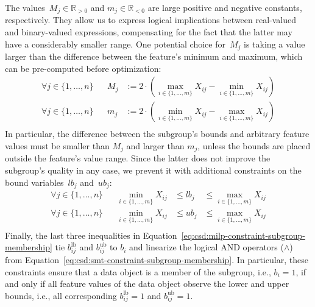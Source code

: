 \documentclass{article}
\theoremstyle{definition}
\begin{document}
The values~$M_j \in \mathbb{R}_{> 0}$ and $m_j \in \mathbb{R}_{< 0}$ are large positive and negative constants, respectively.
They allow us to express logical implications between real-valued and binary-valued expressions, compensating for the fact that the latter may have a considerably smaller range.
One potential choice for~$M_j$ is taking a value larger than the difference between the feature's minimum and maximum, which can be pre-computed before optimization:
%
\begin{equation}
	\begin{aligned}
		\forall j \in \{1, \dots, n\} & & M_j &:= 2 \cdot \left( \max_{i \in \{1, \dots, m\}} X_{ij} - \min_{i \in \{1, \dots, m\}} X_{ij} \right) \\
		\forall j \in \{1, \dots, n\} & & m_j &:= 2 \cdot \left( \min_{i \in \{1, \dots, m\}} X_{ij} - \max_{i \in \{1, \dots, m\}} X_{ij} \right) \\
	\end{aligned}
	\label{eq:csd:milp-big-m}
\end{equation}
%
In particular, the difference between the subgroup's bounds and arbitrary feature values must be smaller than $M_j$ and larger than $m_j$, unless the bounds are placed outside the feature's value range.
Since the latter does not improve the subgroup's quality in any case, we prevent it with additional constraints on the bound variables~$\mathit{lb}_j$ and~$\mathit{ub}_j$:
%
\begin{equation}
	\begin{aligned}
		\forall j \in \{1, \dots, n\} & & \min_{i \in \{1, \dots, m\}} X_{ij} &\leq \mathit{lb}_j &\leq \max_{i \in \{1, \dots, m\}} X_{ij} \\
		\forall j \in \{1, \dots, n\} & & \min_{i \in \{1, \dots, m\}} X_{ij} &\leq \mathit{ub}_j &\leq \max_{i \in \{1, \dots, m\}} X_{ij} \\
	\end{aligned}
	\label{eq:csd:milp-constraint-bounds-in-range}
\end{equation}
%
Finally, the last three inequalities in Equation~\ref{eq:csd:milp-constraint-subgroup-membership} tie $b^{\text{lb}}_{ij}$ and $b^{\text{ub}}_{ij}$ to $b_i$ and linearize the logical AND operators ($\land$) from Equation~\ref{eq:csd:smt-constraint-subgroup-membership}.
In particular, these constraints ensure that a data object is a member of the subgroup, i.e., $b_i = 1$, if and only if all feature values of the data object observe the lower and upper bounds, i.e., all corresponding $b^{\text{lb}}_{ij} = 1$ and $b^{\text{ub}}_{ij} = 1$.
\end{document}
